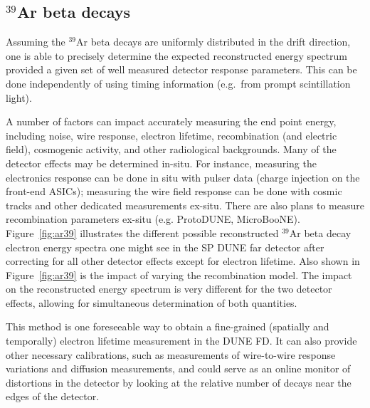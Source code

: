 

\subsection{$^{39}$Ar beta decays}
\label{app:ar39}


Assuming the $^{39}$Ar beta decays are uniformly distributed in the drift direction, one is able to precisely determine the expected reconstructed energy spectrum 
provided a given set of well measured detector response parameters.  This can be done independently of using timing information (e.g.~from prompt scintillation light). 

A number of factors can impact accurately measuring the end point energy, including noise, wire response, electron lifetime, recombination (and electric field), cosmogenic activity, and other radiological backgrounds.
Many of the detector effects may be determined in-situ.  For instance, measuring the electronics response can be done in situ with pulser data (charge injection on the front-end ASICs); measuring the wire field response can be done with cosmic tracks and other dedicated measurements ex-situ. There are also plans to measure recombination parameters ex-situ (e.g. ProtoDUNE, MicroBooNE). Figure~\ref{fig:ar39} illustrates the different possible reconstructed $^{39}$Ar beta decay electron energy spectra one might see in the SP DUNE far detector after correcting for all other detector effects except for electron lifetime.
Also shown in Figure~\ref{fig:ar39} is the impact of varying the 
recombination model.
The impact on the reconstructed energy spectrum is very different for the two detector effects, allowing for simultaneous determination of both quantities.




This method is one foreseeable way to obtain a fine-grained (spatially and temporally) electron lifetime measurement in the DUNE FD.  It can also provide other necessary calibrations, such as measurements of wire-to-wire response variations and diffusion measurements, 
and could serve as an online monitor of 
\efield distortions in the detector by looking at the relative number of decays 
near the edges of the 
detector.  


